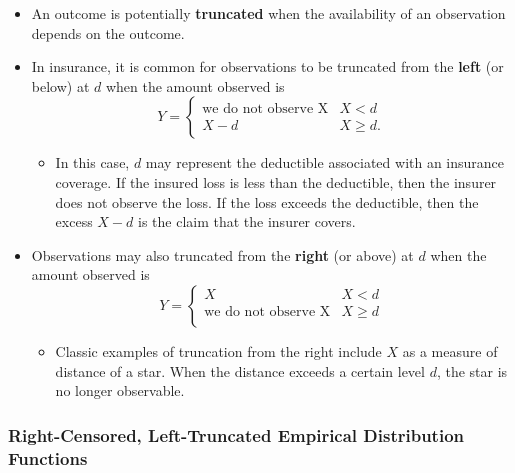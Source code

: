 \documentclass[]{book}
\providecommand{\tightlist}{%
  \setlength{\itemsep}{0pt}\setlength{\parskip}{0pt}}
\begin{document}
\begin{itemize}
\item
  An outcome is potentially \textbf{truncated} when the availability of
  an observation depends on the outcome.
\item
  In insurance, it is common for observations to be truncated from the
  \textbf{left} (or below) at \(d\) when the amount observed is
  \[Y = \begin{cases}
  \text{we do not observe X}  &  X < d\\
  X-d                         &   X \ge d.
  \end{cases}\]

  \begin{itemize}
  \tightlist
  \item
    In this case, \(d\) may represent the deductible associated with an
    insurance coverage. If the insured loss is less than the deductible,
    then the insurer does not observe the loss. If the loss exceeds the
    deductible, then the excess \(X-d\) is the claim that the insurer
    covers.
  \end{itemize}
\item
  Observations may also truncated from the \textbf{right} (or above) at
  \(d\) when the amount observed is \[Y = \begin{cases}
  X   &   X < d  \\
  \text{we do not observe X}  &  X \ge d\\
  \end{cases}\]

  \begin{itemize}
  \tightlist
  \item
    Classic examples of truncation from the right include \(X\) as a
    measure of distance of a star. When the distance exceeds a certain
    level \(d\), the star is no longer observable.
  \end{itemize}
\end{itemize}

\subsubsection{Right-Censored, Left-Truncated Empirical Distribution
Functions}\label{right-censored-left-truncated-empirical-distribution-functions}
\end{document}
